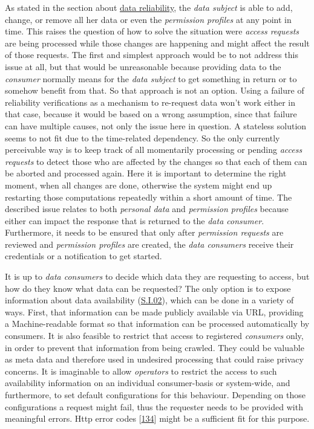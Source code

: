 \documentclass[12pt,english,a4paper,titlepage,cleardoublepage=empty,dottedtoc]{report}
\begin{document}
As stated in the section about \protect\hyperlink{data-reliability}{data
reliability}, the \emph{data subject} is able to add, change, or remove
all her data or even the \emph{permission profiles} at any point in
time. This raises the question of how to solve the situation were
\emph{access requests} are being processed while those changes are
happening and might affect the result of those requests. The first and
simplest approach would be to not address this issue at all, but that
would be unreasonable because providing data to the \emph{consumer}
normally means for the \emph{data subject} to get something in return or
to somehow benefit from that. So that approach is not an option. Using a
failure of reliability verifications as a mechanism to re-request data
won't work either in that case, because it would be based on a wrong
assumption, since that failure can have multiple causes, not only the
issue here in question. A stateless solution seems to not fit due to the
time-related dependency. So the only currently perceivable way is to
keep track of all momentarily processing or pending \emph{access
requests} to detect those who are affected by the changes so that each
of them can be aborted and processed again. Here it is important to
determine the right moment, when all changes are done, otherwise the
system might end up restarting those computations repeatedly within a
short amount of time. The described issue relates to both \emph{personal
data} and \emph{permission profiles} because either can impact the
response that is returned to the \emph{data consumer}. Furthermore, it
needs to be ensured that only after \emph{permission requests} are
reviewed and \emph{permission profiles} are created, the \emph{data
consumers} receive their credentials or a notification to get started.

It is up to \emph{data consumers} to decide which data they are
requesting to access, but how do they know what data can be requested?
The only option is to expose information about data availability
(\protect\hyperlink{si02}{S.I.02}), which can be done in a variety of
ways. First, that information can be made publicly available via URL,
providing a Machine-readable format so that information can be processed
automatically by consumers. It is also feasible to restrict that access
to registered \emph{consumers} only, in order to prevent that
information from being crawled. They could be valuable as meta data and
therefore used in undesired processing that could raise privacy
concerns. It is imaginable to allow \emph{operators} to restrict the
access to such availability information on an individual consumer-basis
or system-wide, and furthermore, to set default configurations for this
behaviour. Depending on those configurations a request might fail, thus
the requester needs to be provided with meaningful errors. Http error
codes {[}\protect\hyperlink{ref-web_spec_http-error-codes}{134}{]} might
be a sufficient fit for this purpose.
\end{document}
